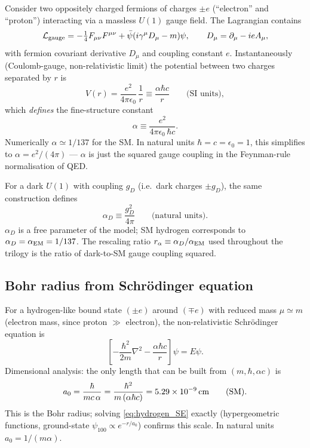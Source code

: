 \documentclass[12pt]{article}
\begin{document}
Consider two oppositely charged fermions of charges $\pm e$
(``electron'' and ``proton'') interacting via a massless $U(1)$
gauge field.  The Lagrangian contains
%
\begin{equation}
  \mathcal{L}_{\rm gauge}
    = -\tfrac{1}{4}F_{\mu\nu}F^{\mu\nu}
      + \bar\psi(i\gamma^\mu D_\mu - m)\psi,
  \qquad
  D_\mu = \partial_\mu - ie A_\mu,
\end{equation}
%
with fermion covariant derivative $D_\mu$ and coupling constant $e$.
Instantaneously (Coulomb-gauge, non-relativistic limit) the potential
between two charges separated by $r$ is
%
\begin{equation}
  V(r) = \frac{e^2}{4\pi\epsilon_0}\,\frac{1}{r}
       \equiv \frac{\alpha \hbar c}{r}
  \qquad\text{(SI units)},
\end{equation}
%
which \emph{defines} the fine-structure constant
%
\begin{equation}
  \alpha \equiv \frac{e^2}{4\pi\epsilon_0\,\hbar c}.
\end{equation}
%
Numerically $\alpha \simeq 1/137$ for the SM.  In natural units
$\hbar = c = \epsilon_0 = 1$, this simplifies to
$\alpha = e^2/(4\pi)$ --- $\alpha$ is just the squared gauge coupling
in the Feynman-rule normalisation of QED.

For a dark $U(1)$ with coupling $g_D$ (i.e.\ dark charges
$\pm g_D$), the same construction defines
%
\begin{equation}
  \alpha_D \equiv \frac{g_D^2}{4\pi}
  \qquad\text{(natural units)}.
\end{equation}
%
$\alpha_D$ is a free parameter of the model; SM hydrogen corresponds
to $\alpha_D = \alpha_{\rm EM} = 1/137$.  The rescaling ratio
$r_\alpha \equiv \alpha_D/\alpha_{\rm EM}$ used throughout the trilogy
is the ratio of dark-to-SM gauge coupling squared.

\subsection{Bohr radius from Schr\"odinger equation}
\label{app:a0}

For a hydrogen-like bound state $(\pm e)$ around $(\mp e)$ with
reduced mass $\mu \simeq m$ (electron mass, since proton $\gg$
electron), the non-relativistic Schr\"odinger equation is
%
\begin{equation}
  \left[-\frac{\hbar^2}{2m}\nabla^2 - \frac{\alpha\hbar c}{r}\right]\psi
    = E\psi.
  \label{eq:hydrogen_SE}
\end{equation}
%
Dimensional analysis: the only length that can be built from
$(m,\hbar,\alpha c)$ is
%
\begin{equation}
  a_0 = \frac{\hbar}{m c\,\alpha}
      = \frac{\hbar^2}{m\,(\alpha\hbar c)}
      = 5.29\times 10^{-9}\,{\rm cm}
      \qquad\text{(SM)}.
  \label{eq:bohr_radius}
\end{equation}
%
This is the Bohr radius; solving \eqref{eq:hydrogen_SE} exactly
(hypergeometric functions, ground-state $\psi_{100}\propto e^{-r/a_0}$)
confirms this scale.  In natural units $a_0 = 1/(m\alpha)$.
\end{document}
